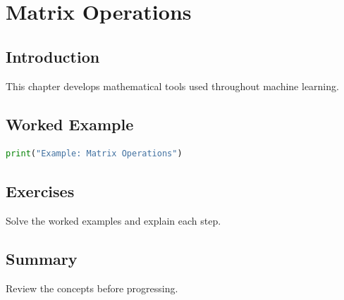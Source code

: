 \chapter{Matrix Operations}
\label{chap:vol4-11}



\section{Introduction}
This chapter develops mathematical tools used throughout machine learning.

\section{Worked Example}
\begin{lstlisting}[language=Python]
print("Example: Matrix Operations")
\end{lstlisting}

\section{Exercises}
\begin{exercise}
Solve the worked examples and explain each step.
\end{exercise}

\section{Summary}
Review the concepts before progressing.
